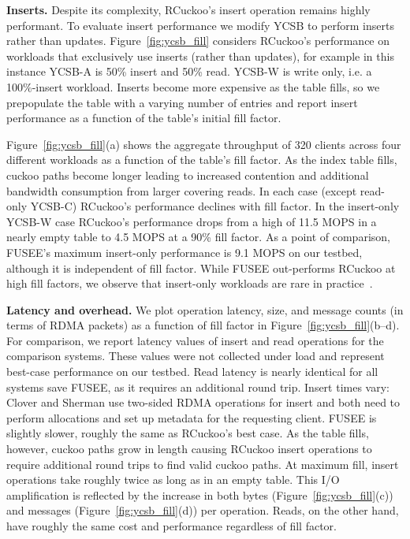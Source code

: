 \textbf{Inserts.}
Despite its complexity, RCuckoo's insert operation remains highly
performant.  To evaluate insert performance we modify YCSB to perform
inserts rather than updates.  Figure~\ref{fig:ycsb_fill} considers
RCuckoo's performance on workloads that exclusively use inserts (rather than
updates), for example in this instance YCSB-A is 50\% insert and 50\%
read. YCSB-W is write only, i.e. a 100\%-insert workload.  Inserts become
more expensive as the table fills, so we prepopulate the table with a varying number of entries and report insert performance as
a function of the table's initial fill factor.

Figure~\ref{fig:ycsb_fill}(a) shows the aggregate throughput of 320
clients across four different workloads as a function of the table's
fill factor.  As the index table fills, cuckoo paths become longer
leading to increased contention and additional bandwidth consumption
from larger covering reads. In each case (except read-only YCSB-C)
RCuckoo's performance declines with fill factor. In the insert-only
YCSB-W case RCuckoo's performance drops from a high of 11.5 MOPS in a
nearly empty table to 4.5 MOPS at a 90\% fill factor.  As a point of
comparison, FUSEE's maximum insert-only performance is 9.1 MOPS on our
testbed, although it is independent of fill factor.  While FUSEE
out-performs RCuckoo at high fill factors, we observe that 
insert-only workloads are rare in
practice~\cite{facebook-memcached}.

\textbf{Latency and overhead.}
We plot operation latency, size, and message counts (in
terms of RDMA packets) as a function of fill factor in
Figure~\ref{fig:ycsb_fill}(b--d).  For comparison, we report
latency values of insert and read operations for the
comparison systems. These values were not collected under
load and represent best-case performance on our testbed.
Read latency is nearly identical for all systems save FUSEE,
as it requires an additional round trip.  Insert times vary:
Clover and Sherman use two-sided RDMA operations for insert
and both need to perform allocations and set up metadata for
the requesting client.  FUSEE is slightly slower, roughly
the same as RCuckoo's best case.  As the table fills,
however, cuckoo paths grow in length causing RCuckoo insert
operations to require additional round trips to find valid
cuckoo paths.  At maximum fill, insert operations take
roughly twice as long as in an empty table. This I/O amplification
is reflected by the increase in both bytes (Figure~\ref{fig:ycsb_fill}(c)) and messages (Figure~\ref{fig:ycsb_fill}(d)) per
operation.  Reads, on the other hand, have roughly
the same cost and performance regardless of fill factor.


